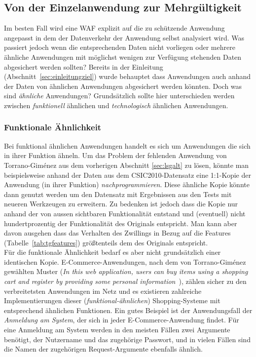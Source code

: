 \subsection{Von der Einzelanwendung zur Mehrgültigkeit}
Im besten Fall wird eine WAF explizit auf die zu schützende Anwendung angepasst in dem der Datenverkehr der Anwendung selbst analysiert wird. Was passiert jedoch wenn die entsprechenden Daten nicht vorliegen oder mehrere ähnliche Anwendungen mit möglichst wenigen zur Verfügung stehenden Daten abgesichert werden sollten? Bereits in der Einleitung (Abschnitt~\ref{sec:einleitungziel}) wurde behauptet dass Anwendungen auch anhand der Daten von ähnlichen Anwendungen abgesichert werden könnten. Doch was sind \glqq\emph{ähnliche}\grqq{} Anwendungen? Grundsätzlich sollte hier unterschieden werden zwischen \emph{funktionell} ähnlichen und \emph{technologisch} ähnlichen Anwendungen.\\

\subsubsection{Funktionale Ähnlichkeit}
Bei funktional ähnlichen Anwendungen handelt es sich um Anwendungen die sich in ihrer Funktion ähneln. Um das Problem der fehlenden Anwendung von Torrano-Giménez aus dem vorherigen Abschnitt \ref{sec:lsgalt}  zu lösen, könnte man beispielsweise anhand der Daten aus dem CSIC2010-Datensatz eine 1:1-Kopie der Anwendung (in ihrer Funktion) \glqq\emph{nachprogrammieren}\grqq. Diese ähnliche Kopie könnte dann genutzt werden um den Datensatz mit Ergebnissen aus den Tests mit neueren Werkzeugen zu erweitern. Zu bedenken ist jedoch dass die Kopie nur anhand der von aussen sichtbaren Funktionalität entstand und (eventuell) nicht hundertprozentig der Funktionalität des Originals entspricht. Man kann aber davon ausgehen dass das Verhalten des Zwillings in Bezug auf die Features (Tabelle~\ref{tab:tgfeatures}) größtenteils dem des Originals entspricht.\\
Für die funktionale Ähnlichkeit bedarf es aber nicht grundsätzlich einer identischen Kopie. E-Commerce-Anwendungen, nach dem von Torrano-Giménez gewählten Muster (\glqq\emph{In this web application, users can buy items using a shopping cart and register by providing some personal information}\grqq{}~\cite{csic2010}), zählen sicher zu den verbreitetsten Anwendungen im Netz und es existieren zahlreiche Implementierungen dieser (\emph{funktional-ähnlichen}) Shopping-Systeme mit entsprechend ähnlichen Funktionen. Ein gutes Beispiel ist der Anwendungsfall der \emph{Anmeldung am System}, der sich in jeder E-Commerce-Anwendung findet. Für eine Anmeldung am System werden in den meisten Fällen zwei Argumente benötigt, der Nutzername und das zugehörige Passwort, und in vielen Fällen sind die Namen der zugehörigen Request-Argumente ebenfalls ähnlich. 

